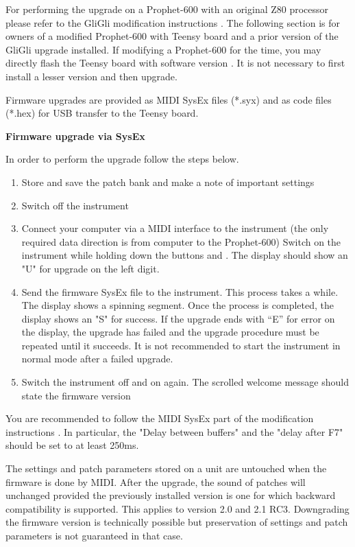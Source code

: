 For performing the upgrade on a Prophet-600 with an original Z80 processor please refer to the GliGli modification instructions \cite{modinstructions}. The following section is for owners of a modified Prophet-600 with Teensy board and a prior version of the GliGli upgrade installed. If modifying a Prophet-600 for the time, you may directly flash the Teensy board with software version \version. It is not necessary to first install a lesser version and then upgrade.

Firmware upgrades are provided as MIDI SysEx files (*.syx) and as code files (*.hex) for USB transfer to the Teensy board. 

\textbf{Firmware upgrade via SysEx}

In order to perform the upgrade follow the steps below.

\begin{enumerate}
  \setlength\itemsep{0cm}
  \item Store and save the patch bank and make a note of important settings
  \item Switch off the instrument
  \item Connect your computer via a MIDI interface to the instrument (the only required data direction is from computer to the Prophet-600) 
  Switch on the instrument while holding down the buttons \totape and \fromtape. The display should show an "U" for upgrade on the left digit.
  \item Send the firmware SysEx file to the instrument. This process takes a while. The display shows a spinning segment. Once the process is completed, the display shows an "S" for success. If the upgrade ends with “E” for error on the display, the upgrade has failed and the upgrade procedure must be repeated until it succeeds. It is not recommended to start the instrument in normal mode after a failed upgrade.
  \item Switch the instrument off and on again. The scrolled welcome message should state the firmware version 
\end{enumerate}

You are recommended to follow the MIDI SysEx part of the modification instructions \cite{modinstructions}. In particular, the "Delay between buffers" and the "delay after F7" should be set to at least 250ms.

The settings and patch parameters stored on a unit are untouched when the firmware is done by MIDI. After the upgrade, the sound of patches will unchanged provided the previously installed version is one for which backward compatibility is supported. This applies to version 2.0 and 2.1 RC3. Downgrading the firmware version is technically possible but preservation of settings and patch parameters is not guaranteed in that case.

